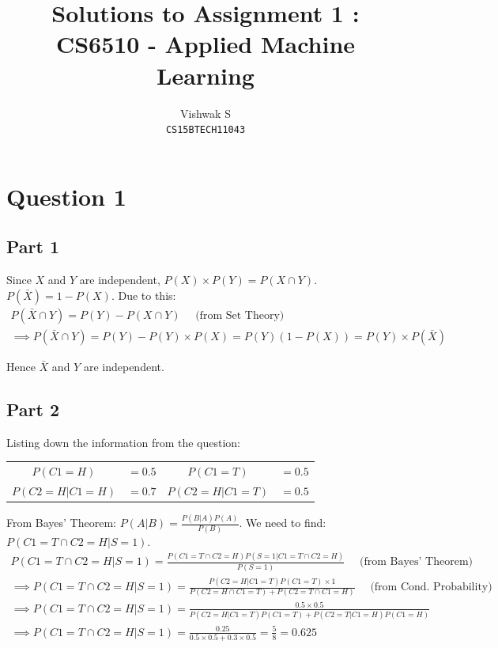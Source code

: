 \documentclass{article}
\title{Solutions to Assignment 1 : CS6510 - Applied Machine Learning}
\author{Vishwak S\\
\texttt{CS15BTECH11043}}
\date{}
\begin{document}
\maketitle

\section*{Question 1}
\subsection*{Part 1}
\begin{flushleft}
Since \(X\) and \(Y\) are independent, \(P(X)\times P(Y) = P(X \cap Y)\). \(P(\bar{X}) = 1 - P(X)\). Due to this:
\begin{gather*}
P(\bar{X} \cap Y) = P(Y) - P(X \cap Y) \quad \text{ (from Set Theory)} \\
\implies P(\bar{X} \cap Y) = P(Y) - P(Y)\times P(X) = P(Y)(1 - P(X)) = P(Y) \times P(\bar{X}) 
\end{gather*}

Hence \(\bar{X}\) and \(Y\) are independent.
\end{flushleft}

\subsection*{Part 2}
\begin{flushleft}
Listing down the information from the question:
\begin{center}
\begin{tabular}{c c c c}
\(P(C1 = H) \) & \(= 0.5\) & \(P(C1 = T) \) & \( = 0.5\) \\
\(P(C2 = H | C1 = H) \) & \(= 0.7\) & \(P(C2 = H | C1 = T) \) & \( = 0.5\) 
\end{tabular}
\end{center}

From Bayes' Theorem: \(P(A | B) = \displaystyle \frac{P(B | A) P(A)}{P(B)}\). We need to find: \(P(C1 = T \cap C2 = H | S = 1)\).
\begin{gather*}
\displaystyle P(C1 = T \cap C2 = H | S = 1) = \frac{P(C1 = T \cap C2 = H) P(S = 1 | C1 = T \cap C2 = H)}{P(S = 1)} \quad \text{ (from Bayes' Theorem)} \\
\implies \displaystyle P(C1 = T \cap C2 = H | S = 1) = \frac{P(C2 = H | C1 = T) P(C1 = T) \times 1}{P(C2 = H \cap C1 = T) + P(C2 = T \cap C1 = H)} \quad \text{ (from Cond. Probability)} \\
\implies \displaystyle P(C1 = T \cap C2 = H | S = 1) = \frac{0.5 \times 0.5}{P(C2 = H | C1 = T) P(C1 = T) + P(C2 = T | C1 = H) P(C1 = H)} \\
\implies \displaystyle P(C1 = T \cap C2 = H | S = 1) = \frac{0.25}{0.5 \times 0.5 + 0.3 \times 0.5} = \frac{5}{8} = \boxed{0.625}
\end{gather*}
\end{flushleft}
\end{document}

